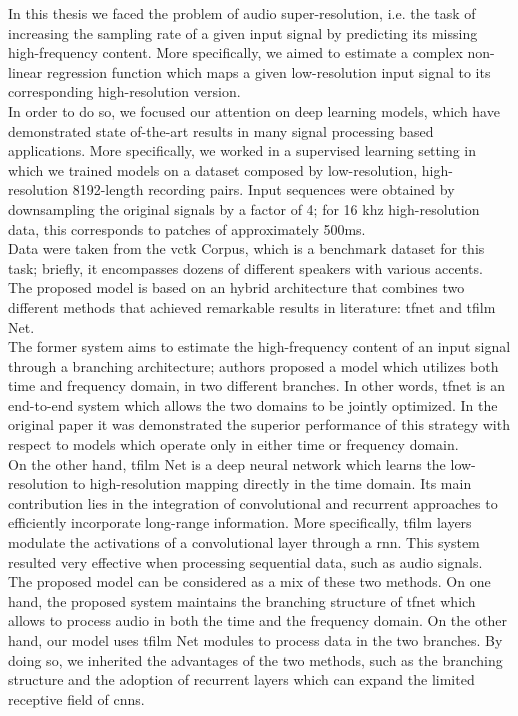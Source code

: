 In this thesis we faced the problem of audio super-resolution, i.e. the task of increasing the sampling rate of a given input signal by predicting its missing high-frequency content. More specifically, we aimed to estimate a complex non-linear regression function which maps a given low-resolution input signal to its corresponding high-resolution version. \\
In order to do so, we focused our attention on deep learning models, which have demonstrated state of-the-art results in many signal processing based applications. More specifically, we worked in a supervised learning setting in which we trained models on a dataset composed by low-resolution, high-resolution 8192-length recording pairs. Input sequences were obtained by downsampling the original signals by a factor of 4; for 16 k\gls{hz} high-resolution data, this corresponds to patches of approximately 500ms. \\
Data were taken from the \gls{vctk} Corpus, which is a benchmark dataset for this task; briefly, it encompasses dozens of different speakers with various accents. \\
The proposed model is based on an hybrid architecture that combines two different methods that achieved remarkable results in literature: \gls{tfnet} and \gls{tfilm} Net. \\
The former system aims to estimate the high-frequency content of an input signal through a branching architecture; authors proposed a model which utilizes both time and frequency domain, in two different branches. In other words, \gls{tfnet} is an end-to-end system which allows the two domains to be jointly optimized. In the original paper it was demonstrated the superior performance of this strategy with respect to models which operate only in either time or frequency domain. \\
On the other hand, \gls{tfilm} Net is a deep neural network which learns the low-resolution to high-resolution mapping directly in the time domain. Its main contribution lies in the integration of convolutional and recurrent approaches to efficiently incorporate long-range information. More specifically, \gls{tfilm} layers modulate the activations of a convolutional layer through a \gls{rnn}. This system resulted very effective when processing sequential data, such as audio signals. \\
The proposed model can be considered as a mix of these two methods. On one hand, the proposed system maintains the branching structure of \gls{tfnet} which allows to process audio in both the time and the frequency domain. On the other hand, our model uses \gls{tfilm} Net modules to process data in the two branches. By doing so, we inherited the advantages of the two methods, such as the branching structure and the adoption of recurrent layers which can expand the limited receptive field of \gls{cnn}s. \\

